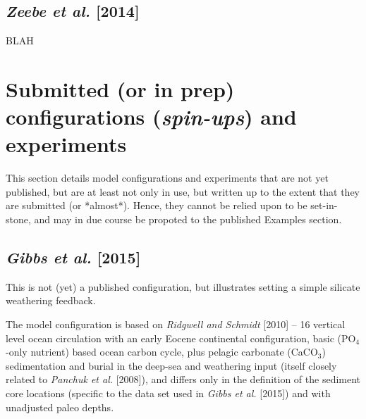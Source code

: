 \documentclass[10pt,twoside]{article}
\begin{document}
\subsection{\textit{Zeebe et al.} [2014]}

BLAH


\newpage
\section{Submitted (or in prep) configurations (\textit{spin-ups}) and experiments}\label{submitted}

This section details model configurations and experiments that are not yet published, but are at least not only in use, but written up to the extent that they are submitted (or *almost*). Hence, they cannot be relied upon to be set-in-stone, and may in due course be propoted to the published Examples section.


\subsection{\textit{Gibbs et al.} [2015]}

This is not (yet) a published configuration, but illustrates setting a simple silicate weathering feedback. 

The model configuration is based on \textit{Ridgwell and Schmidt} [2010] -- 16 vertical level ocean circulation with an early Eocene continental configuration, basic (PO$_{4}$-only nutrient) based ocean carbon cycle, plus pelagic carbonate (CaCO$_{3}$) sedimentation and burial in the  deep-sea and weathering input (itself closely related to \textit{Panchuk et al.} [2008]), and differs only in the definition of the sediment core locations (specific to the data set used in \textit{Gibbs et al.} [2015]) and with unadjusted paleo depths.
\end{document}
